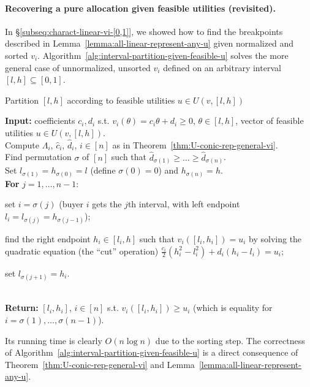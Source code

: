 \paragraph{Recovering a pure allocation given feasible utilities (revisited).}
In \S\ref{subseq:charact-linear-vi-[0,1]}, we showed how to find the breakpoints described in Lemma~\ref{lemma:all-linear-represent-any-u} given normalized and sorted $v_i$. 
Algorithm~\ref{alg:interval-partition-given-feasible-u} solves the more general case of unnormalized, unsorted $v_i$ defined on an arbitrary interval $[l,h] \subseteq [0,1]$. 
\begin{algorithm}
	\caption{Partition $[l,h]$ according to feasible utilities $u\in U(v, [l,h])$}
	\textbf{Input:} coefficients $c_i, d_i$ s.t. $v_i(\theta) = c_i\theta + d_i \geq 0$, $\theta\in [l,h]$, vector of feasible utilities $u\in U(v, [l, h])$. \\
	Compute $\Lambda_i$, $\hat{c}_i$, $\hat{d}_i$, $i\in [n]$ as in Theorem~\ref{thm:U-conic-rep-general-vi}. \\
	Find permutation $\sigma$ of $[n]$ such that $\hat{d}_{\sigma(1)} \geq \dots \geq \hat{d}_{\sigma(n)}$. \\
	Set $l_{\sigma(1)} = h_{\sigma(0)} = l$ (define $\sigma(0)  = 0$) and $h_{\sigma(n)} = h$.\\
	\textbf{For} $j = 1, \dots, n-1$:
	\begin{enumerate*}[(i)]
		\item set $i = \sigma(j)$ (buyer $i$ gets the $j$th interval, with left endpoint $l_i = l_{\sigma(j)} = h_{\sigma(j-1)}$);
		\item find the right endpoint $h_i\in [l_i, h]$ such that $v_i([l_i, h_i]) = u_i$ by solving the quadratic equation (the ``cut'' operation)
		$\frac{c_i}{2}(h_i^2 - l_i^2) + d_i(h_i - l_i) = u_i$;
		\item set $l_{\sigma(j+1)} = h_i$.
	\end{enumerate*}\\[1ex]
	 \textbf{Return:} $[l_i, h_i]$, $i\in [n]$ s.t. $v_i([l_i, h_i])\geq u_i$ (which is equality for $i=\sigma(1), \dots, \sigma(n-1)$).
	\label{alg:interval-partition-given-feasible-u}
\end{algorithm}
Its running time is clearly $O(n\log n)$ due to the sorting step. 
The correctness of Algorithm~\ref{alg:interval-partition-given-feasible-u} is a direct consequence of Theorem~\ref{thm:U-conic-rep-general-vi} and Lemma~\ref{lemma:all-linear-represent-any-u}. 

